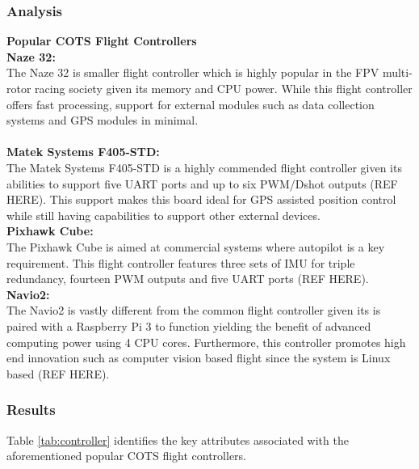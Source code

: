 \subsubsection{Analysis}
\textbf{Popular COTS Flight Controllers}\\

\textbf{Naze 32:}\\
The Naze 32 is smaller flight controller which is highly popular in the FPV multi-rotor racing society given its memory and CPU power. While this flight controller offers fast processing, support for external modules such as data collection systems and GPS modules in minimal.\\
\\
\textbf{Matek Systems F405-STD:}\\
The Matek Systems F405-STD is a highly commended flight controller given its abilities to support five UART ports and up to six PWM/Dshot outputs (REF HERE). This support makes this board ideal for GPS assisted position control while still having capabilities to support other external devices. \\

\textbf{Pixhawk Cube:}\\
The Pixhawk Cube is aimed at commercial systems where autopilot is a key requirement. This flight controller features three sets of IMU for triple redundancy, fourteen PWM outputs and five UART ports (REF HERE).\\

\textbf{Navio2:}\\
The Navio2 is vastly different from the common flight controller given its is paired with a Raspberry Pi 3 to function yielding the benefit of advanced computing power using 4 CPU cores. Furthermore, this controller promotes high end innovation such as computer vision based flight since the system is Linux based (REF HERE).\\


\subsubsection{Results}

Table \ref{tab:controller} identifies the key attributes associated with the aforementioned popular COTS flight controllers.

